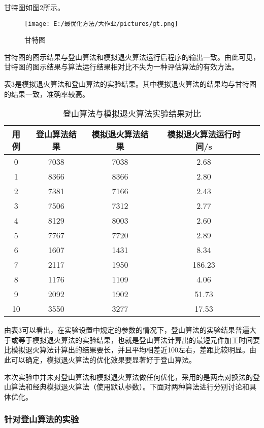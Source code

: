 \documentclass[UTF8]{ctexart}
\begin{document}
甘特图如图2所示。
\begin{figure}
	\centering
	\texttt{[image: E:/最优化方法/大作业/pictures/gt.png]}
	\caption{甘特图}
\end{figure}

甘特图的图示结果与登山算法和模拟退火算法运行后程序的输出一致。由此可见，甘特图的图示结果与算法运行结果相对比不失为一种评估算法的有效方法。

表3是模拟退火算法和登山算法的实验结果。其中模拟退火算法的结果均与甘特图的结果一致，准确率较高。

\begin{table} 
	\centering
	\caption{登山算法与模拟退火算法实验结果对比}
	\begin{tabular}{ccccc} %
		
		\toprule %
		用例 & 登山算法结果 & 模拟退火算法结果 & 模拟退火算法运行时间/s \\
		\hline %
		0 & 7038 & 7038 & 2.68 \\
		1 & 8366 & 8366 & 2.80 \\
		2 & 7381 & 7166 & 2.43 \\
		3 & 7506 & 7312 & 2.77 \\
		4 & 8129 & 8003 & 2.60 \\
		5 & 7767 & 7720 & 2.89 \\
		6 & 1607 & 1431 & 8.34 \\
		7 & 2117 & 1950 & 186.23 \\
		8 & 1176 & 1109 & 4.06 \\
		9 & 2092 & 1902 & 51.73 \\
		10 & 3550 & 3277 & 17.53 \\
		\bottomrule %
	\end{tabular}
\end{table}


由表3可以看出，在实验设置中规定的参数的情况下，登山算法的实验结果普遍大于或等于模拟退火算法的实验结果，也就是登山算法计算出的最短元件加工时间要比模拟退火算法计算出的结果要长，并且平均相差近100左右，差距比较明显。由此可以确定，模拟退火算法的优化效果要显著好于登山算法。

本次实验中并未对登山算法和模拟退火算法做任何优化，采用的是两点对换法的登山算法和经典模拟退火算法（使用默认参数）。下面对两种算法进行分别讨论和具体优化。

\subsubsection{针对登山算法的实验}
\end{document}
